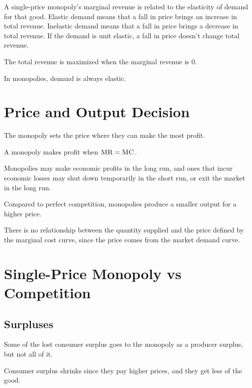                 A single-price monopoly's marginal revenue is related to the elasticity of demand for that good.
                Elastic demand means that a fall in price brings an increase in total revenue.
                Inelastic demand means that a fall in price brings a decrease in total revenue.
                If the demand is unit elastic, a fall in price doesn't change total revenue.

                The total revenue is maximized when the marginal revenue is 0.

                In monopolies, demand is always elastic.
            \section{Price and Output Decision} %
            \label{sec:price_and_output_decision}
                The monopoly sets the price where they can make the most profit.

                A monopoly makes profit when $\textsc{MR} = \textsc{MC}$.

                Monopolies may make economic profits in the long run, and ones that incur economic losses may shut down temporarily in the short run, or exit the market in the long run.

                Compared to perfect competition, monopolies produce a smaller output for a higher price.

                There is no relationship between the quantity supplied and the price defined by the marginal cost curve, since the price comes from the market demand curve.
            \section{Single-Price Monopoly vs Competition} %
            \label{sec:single_price_monopoly_vs_competition}
                \subsection{Surpluses} %
                \label{sub:surpluses}
                    Some of the lost consumer surplus goes to the monopoly as a producer surplus, but not all of it.

                    Consumer surplus shrinks since they pay higher prices, and they get less of the good.

